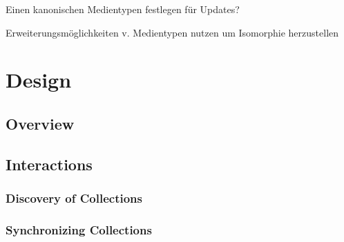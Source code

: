 \documentclass[12pt,a4paper]{scrartcl}		%
\newcommand{\citeurl}[2]{\url{#1} (#2)}
\begin{document}
Einen kanonischen Medientypen festlegen für Updates?

Erweiterungsmöglichkeiten v. Medientypen nutzen um Isomorphie herzustellen


\section{Design}






\subsection{Overview}

\subsection{Interactions}
\subsubsection{Discovery of Collections}
\subsubsection{Synchronizing Collections}
\end{document}
